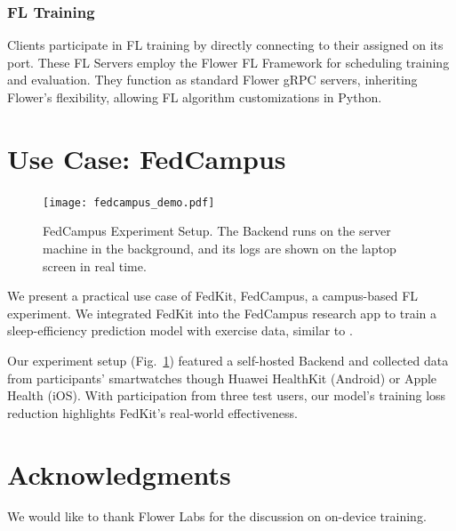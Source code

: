 \documentclass[letterpaper]{article} %
\begin{document}
\subsubsection{FL Training}
Clients participate in FL training by directly connecting to
their assigned \fs{} on its port.
These FL Servers employ the Flower FL Framework for
scheduling training and evaluation.
They function as standard Flower gRPC servers,
inheriting Flower's flexibility,
allowing FL algorithm customizations in Python.

\section{Use Case: FedCampus}

\begin{figure}
    \centering
    \texttt{[image: fedcampus\_demo.pdf]}
    \caption{FedCampus Experiment Setup.
        The Backend runs on the server machine in the background,
        and its logs are shown on the laptop screen in real time.}
    \label{fig:fedcampus}
\end{figure}

We present a practical use case of FedKit, FedCampus,
a campus-based FL experiment.
We integrated FedKit into the FedCampus research app to
train a sleep-efficiency prediction model with exercise data,
similar to \cite{khoa2022fedmcrnn}.

Our experiment setup (Fig.~\ref{fig:fedcampus}) featured a self-hosted Backend
and collected data from participants' smartwatches
though Huawei HealthKit (Android) or Apple Health (iOS).
With participation from three test users,
our model's training loss reduction highlights
FedKit's real-world effectiveness.

\appendix

\section*{Acknowledgments}
We would like to thank Flower Labs for the discussion on on-device training.

\bigskip


\end{document}
